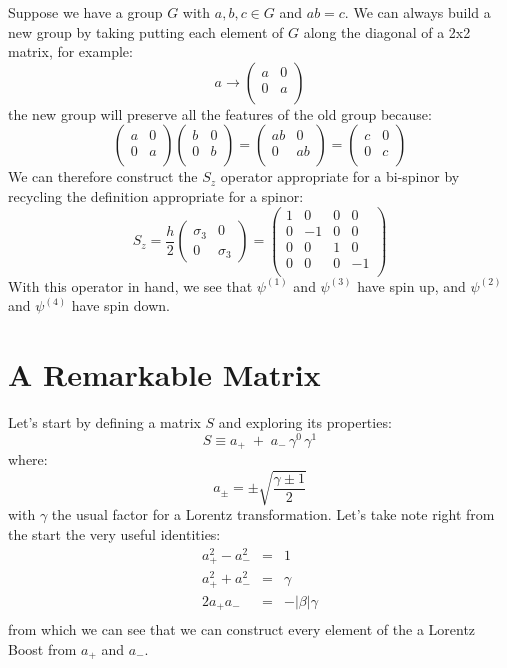 \documentclass[12pt]{book}
\begin{document}
Suppose we have a group $G$ with $a,b,c \in G$ and $ab = c$.  We can always build a new group by taking putting each element of $G$ along the diagonal of a 2x2 matrix, for example:
$$a \to \begin{pmatrix} a & 0 \\ 0 & a \\ \end{pmatrix}$$
the new group will preserve all the features of the old group because:
$$\begin{pmatrix} a & 0 \\ 0 & a \\ \end{pmatrix}
\begin{pmatrix} b & 0 \\ 0 & b \\ \end{pmatrix}
= \begin{pmatrix} ab & 0 \\ 0 & ab \\ \end{pmatrix} = 
\begin{pmatrix} c & 0 \\ 0 & c \\ \end{pmatrix}$$
We can therefore construct the $S_z$ operator appropriate for a bi-spinor by recycling the definition appropriate for a spinor:
$$S_z = \frac{h}{2} \begin{pmatrix} \sigma_3 & 0 \\ 0 & \sigma_3 \end{pmatrix}
= \begin{pmatrix} 
1 & 0 & 0 & 0 \\ 
0 &-1 & 0 & 0 \\ 
0 & 0 & 1 & 0 \\ 
0 & 0 & 0 &-1 \\ 
\end{pmatrix}
$$
With this operator in hand, we see that $\psi^{(1)}$ and $\psi^{(3)}$ have spin up, and 
$\psi^{(2)}$ and $\psi^{(4)}$ have spin down.

\section{A Remarkable Matrix}
Let's start by defining a matrix $S$ and exploring its properties:
$$S \equiv a_+ \; + \; a_- \, \gamma^0 \, \gamma^1$$
where:
$$a_\pm = \pm \sqrt{\frac{\gamma \pm 1}{2}}$$
with $\gamma$ the usual factor for a Lorentz transformation.  Let's take note right from the start the very useful identities:
\begin{eqnarray*}
a_{+}^2 - a_{-}^2 &=& 1 \\
a_{+}^2 + a_{-}^2 &=& \gamma \\
2 a_{+} a_{-} &=& -|\beta| \gamma \\
\end{eqnarray*}
from which we can see that we can construct every element of the a Lorentz Boost from $a_+$ and $a_-$.
\end{document}
